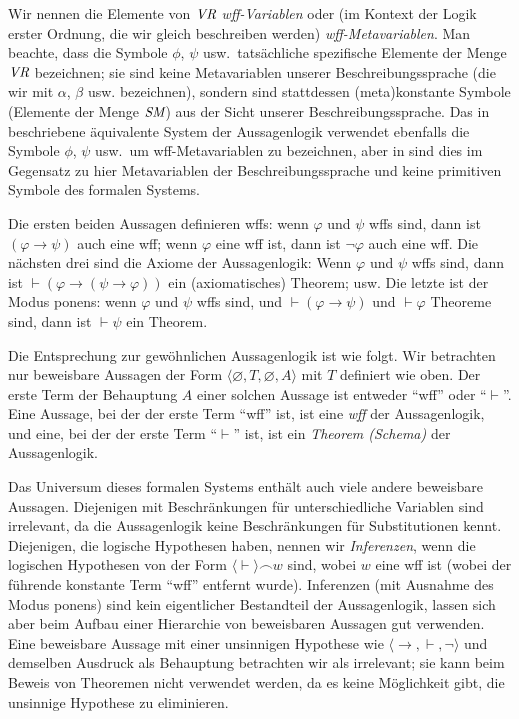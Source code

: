 Wir nennen die Elemente von $\mbox{\em VR}$ {\em wff-Variablen} oder (im Kontext der Logik erster Ordnung, die wir gleich beschreiben werden) {\em wff-Metavariablen}. Man beachte, dass die Symbole $\phi$, $\psi$ usw.\ tatsächliche spezifische Elemente der Menge $\mbox{\em VR}$ bezeichnen; sie sind keine Metavariablen unserer Beschreibungssprache (die wir mit $\alpha$, $\beta$ usw. bezeichnen), sondern sind stattdessen (meta)konstante Symbole (Elemente der Menge $\mbox{\em SM}$) aus der Sicht unserer Beschreibungssprache.  Das in \cite{Tarski1965} beschriebene äquivalente System der Aussagenlogik verwendet ebenfalls die Symbole $\phi$, $\psi$ usw.\, um wff-Metavariablen zu bezeichnen, aber in \cite{Tarski1965} sind dies im Gegensatz zu hier Metavariablen der Beschreibungssprache und keine primitiven Symbole des formalen Systems. 

Die ersten beiden Aussagen definieren wffs: wenn $\varphi$ und $\psi$ wffs sind, dann ist $(\varphi \to \psi)$ auch eine wff; wenn $\varphi$ eine wff ist, dann ist $\lnot\varphi$ auch eine wff. Die nächsten drei sind die Axiome der Aussagenlogik: Wenn $\varphi$ und $\psi$ wffs sind, dann ist $\vdash (\varphi \to (\psi \to \varphi))$ ein (axiomatisches) Theorem; usw. Die letzte ist der Modus ponens: wenn $\varphi$ und $\psi$ wffs sind, und $\vdash (\varphi\to\psi)$ und $\vdash \varphi$ Theoreme sind, dann ist $\vdash \psi$ ein Theorem. 

Die Entsprechung zur gewöhnlichen Aussagenlogik ist wie folgt.  Wir betrachten nur beweisbare Aussagen der Form $\langle\varnothing, T,\varnothing,A\rangle$ mit $T$ definiert wie oben.  Der erste Term der Behauptung $A$ einer solchen Aussage ist entweder "`wff"' oder "`$\vdash$"'.  Eine Aussage, bei der der erste Term "`wff"' ist, ist eine {\em wff} der Aussagenlogik, und eine, bei der der erste Term "`$\vdash$"' ist, ist ein {\em Theorem (Schema)} der Aussagenlogik. 

Das Universum dieses formalen Systems enthält auch viele andere beweisbare Aussagen.  Diejenigen mit Beschränkungen für unterschiedliche Variablen sind irrelevant, da die Aussagenlogik keine Beschränkungen für Substitutionen kennt.  Diejenigen, die logische Hypothesen haben, nennen wir {\em Inferenzen}, wenn die logischen Hypothesen von der Form $\langle\vdash\rangle\frown w$ sind, wobei $w$ eine wff ist (wobei der führende konstante Term "`wff"' entfernt wurde).  Inferenzen (mit Ausnahme des Modus ponens) sind kein eigentlicher Bestandteil der Aussagenlogik, lassen sich aber beim Aufbau einer Hierarchie von beweisbaren Aussagen gut verwenden.  Eine beweisbare Aussage mit einer unsinnigen Hypothese wie $\langle \to,\vdash,\lnot\rangle$ und demselben Ausdruck als Behauptung betrachten wir als irrelevant; sie kann beim Beweis von Theoremen nicht verwendet werden, da es keine Möglichkeit gibt, die unsinnige Hypothese zu eliminieren. 

